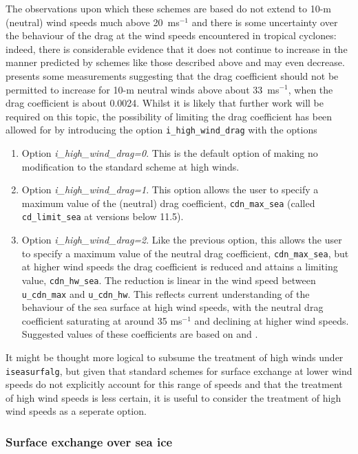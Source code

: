 \documentclass{UMDP_article}
\begin{document}
The observations upon which these schemes are based do not extend to
10-m (neutral) wind speeds much above 20~ms${}^{-1}$ and there is 
some uncertainty
over the behaviour of the drag at the wind speeds encountered in
tropical cyclones: indeed, there is considerable evidence that it
does not continue to increase in the manner predicted by schemes
like those described above and may even decrease. \cite{Donelan2004}
presents some measurements suggesting that the drag coefficient should
not be permitted to increase for 10-m neutral winds above about 
33~ms${}^{-1}$, when the drag coefficient is about 0.0024. Whilst it is
likely that further work will be required on this topic, the possibility
of limiting the drag coefficient has been allowed for by introducing
the option {\tt i\_high\_wind\_drag} with the options
\begin{enumerate}
\item Option {\sl i\_high\_wind\_drag=0}.  This is the default option
of making no modification to the standard scheme at high winds.
\item Option {\sl i\_high\_wind\_drag=1}.  This option allows the
user to specify a maximum value of the (neutral) drag coefficient,
{\tt cdn\_max\_sea} (called {\tt cd\_limit\_sea} at versions below 11.5). 
\item Option {\sl i\_high\_wind\_drag=2}.  Like the previous option,
this allows the user to specify a maximum value of the neutral drag 
coefficient, {\tt cdn\_max\_sea}, but at higher wind speeds the drag
coefficient is reduced and attains a limiting value, {\tt cdn\_hw\_sea}.
The reduction is linear in the wind speed between {\tt u\_cdn\_max} and
{\tt u\_cdn\_hw}. This reflects current understanding of the behaviour
of the sea surface at high wind speeds, with the neutral drag coefficient
saturating at around 35 ms${}^{-1}$ and declining at higher wind speeds.
Suggested values of these coefficients are based on \cite{donelan2018}
and \cite{hsu2017}.
\end{enumerate}
It might be thought more logical to subsume the treatment of high winds
under {\tt iseasurfalg}, but given that standard schemes for surface
exchange at lower wind speeds do not explicitly account for this range
of speeds and that the treatment of high wind speeds is less certain,
it is useful to consider the treatment of high wind speeds as a seperate
option.

\subsubsection{Surface exchange over sea ice}
\end{document}
